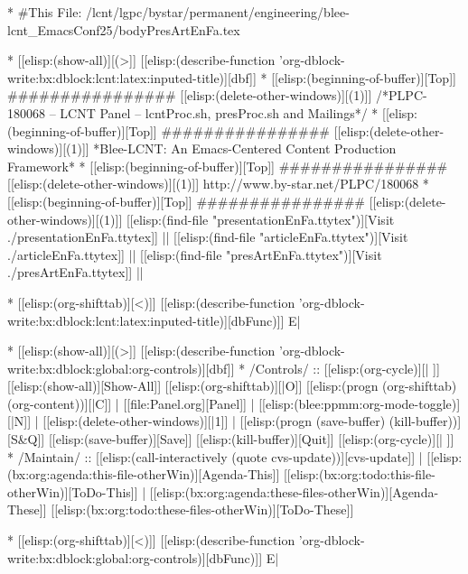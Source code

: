 
\begin{whenOrg}
*  #This File: /lcnt/lgpc/bystar/permanent/engineering/blee-lcnt_EmacsConf25/bodyPresArtEnFa.tex
\end{whenOrg}

\begin{whenOrg}
* [[elisp:(show-all)][(>]] [[elisp:(describe-function 'org-dblock-write:bx:dblock:lcnt:latex:inputed-title)][dbf]]
*  [[elisp:(beginning-of-buffer)][Top]] ################  [[elisp:(delete-other-windows)][(1)]]   /*PLPC-180068 -- LCNT Panel -- lcntProc.sh, presProc.sh and Mailings*/
*  [[elisp:(beginning-of-buffer)][Top]] ################  [[elisp:(delete-other-windows)][(1)]]   *Blee-LCNT: An Emacs-Centered Content Production Framework*
*  [[elisp:(beginning-of-buffer)][Top]] ################  [[elisp:(delete-other-windows)][(1)]]   http://www.by-star.net/PLPC/180068
*  [[elisp:(beginning-of-buffer)][Top]] ################  [[elisp:(delete-other-windows)][(1)]]   [[elisp:(find-file "presentationEnFa.ttytex")][Visit ./presentationEnFa.ttytex]] || [[elisp:(find-file "articleEnFa.ttytex")][Visit ./articleEnFa.ttytex]] || [[elisp:(find-file "presArtEnFa.ttytex")][Visit ./presArtEnFa.ttytex]] ||

* [[elisp:(org-shifttab)][<)]] [[elisp:(describe-function 'org-dblock-write:bx:dblock:lcnt:latex:inputed-title)][dbFunc)]]  E|
\end{whenOrg}

\begin{whenOrg}
* [[elisp:(show-all)][(>]] [[elisp:(describe-function 'org-dblock-write:bx:dblock:global:org-controls)][dbf]]
*  /Controls/ ::  [[elisp:(org-cycle)][| ]]  [[elisp:(show-all)][Show-All]]  [[elisp:(org-shifttab)][|O]]  [[elisp:(progn (org-shifttab) (org-content))][|C]] | [[file:Panel.org][Panel]] | [[elisp:(blee:ppmm:org-mode-toggle)][|N]] | [[elisp:(delete-other-windows)][|1]] | [[elisp:(progn (save-buffer) (kill-buffer))][S&Q]]  [[elisp:(save-buffer)][Save]]  [[elisp:(kill-buffer)][Quit]] [[elisp:(org-cycle)][| ]]
*  /Maintain/ ::  [[elisp:(call-interactively (quote cvs-update))][cvs-update]] | [[elisp:(bx:org:agenda:this-file-otherWin)][Agenda-This]] [[elisp:(bx:org:todo:this-file-otherWin)][ToDo-This]] | [[elisp:(bx:org:agenda:these-files-otherWin)][Agenda-These]] [[elisp:(bx:org:todo:these-files-otherWin)][ToDo-These]]

* [[elisp:(org-shifttab)][<)]] [[elisp:(describe-function 'org-dblock-write:bx:dblock:global:org-controls)][dbFunc)]]  E|
\end{whenOrg}

